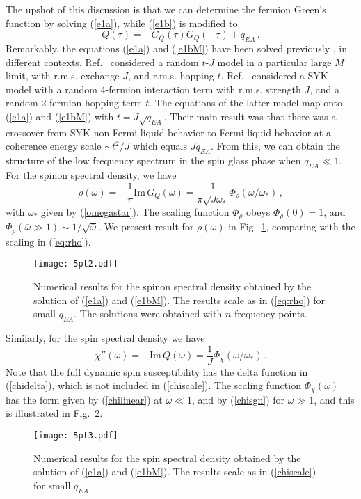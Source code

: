 \documentclass[aps,prx,preprint,onecolumn,citeautoscript,superscriptaddress,nofootinbib,
eqsecnum]{revtex4}
\newcommand{\beq}{\begin{equation}}
\newcommand{\eeq}{\end{equation}}
\begin{document}
{The upshot of this discussion is that we can determine the fermion Green's function by solving (\ref{e1a}), while (\ref{e1b}) is modified to 
\beq
Q(\tau) = - G_Q (\tau) G_Q (-\tau) + q_{EA}\,. \label{e1bM}
\eeq
Remarkably, the equations (\ref{e1a}) and (\ref{e1bM}) have been solved previously \cite{PG98, Balents2017}, in different contexts. Ref.~\cite{PG98} considered a random $t$-$J$ model in a particular large $M$ limit,  with r.m.s. exchange $J$, and r.m.s. hopping $t$. Ref.~\cite{Balents2017} considered a SYK model with a random 4-fermion interaction term with r.m.s. strength $J$, and a random 2-fermion hopping term $t$. The equations of the latter model map onto (\ref{e1a}) and (\ref{e1bM}) with $t = J \sqrt{q_{EA}}$.
Their main result was that there was a crossover from SYK non-Fermi liquid behavior to Fermi liquid behavior at a coherence energy scale $\sim t^2/J$ \cite{PG98, Balents2017} which equals $J q_{EA}$. From this, we can obtain the structure of the low frequency spectrum in the spin glass phase when $q_{EA} \ll 1$. 
For the spinon spectral density, we have
\beq
\rho (\omega)  = - \frac{1}{\pi} \mbox{Im} \, G_Q (\omega) = \frac{1}{\pi \sqrt{J \omega_\ast}} \Phi_\rho (\omega/\omega_\ast)\,, \label{eq:rho}
\eeq
with $\omega_\ast$ given by (\ref{omegastar}). 
The scaling function $\Phi_\rho$ obeys $\Phi_\rho (0) = 1$, and $\Phi_\rho (\overline{\omega} \gg 1) \sim 1/\sqrt{\overline{\omega}}$. We present result for $\rho(\omega)$ in Fig.~\ref{fig:spinon}, comparing with the scaling in (\ref{eq:rho}). 
\begin{figure}
\begin{center}
\texttt{[image: 5pt2.pdf]}
\end{center}
\caption{Numerical results for the spinon spectral density obtained by the solution of (\ref{e1a}) and (\ref{e1bM}). The results scale as in (\ref{eq:rho}) for small $q_{EA}$. The solutions were obtained with $n$ frequency points.}
\label{fig:spinon}
\end{figure}

Similarly, for the spin spectral density we have
\beq
\chi'' (\omega) = - \mbox{Im} \, Q (\omega) = \frac{1}{J} \Phi_\chi (\omega/\omega_\ast)\,. \label{chiscale}
\eeq
Note that the full dynamic spin susceptibility has the delta function in (\ref{chidelta}), which is not included in  (\ref{chiscale}). The scaling function $\Phi_\chi (\overline{\omega})$ has the form given by (\ref{chilinear}) at $\overline{\omega} \ll 1$, and by (\ref{chisgn}) for $\overline{\omega} \gg 1$, and this is illustrated in Fig.~\ref{fig:chi}.
\begin{figure}
\begin{center}
\texttt{[image: 5pt3.pdf]}
\end{center}
\caption{Numerical results for the spin spectral density obtained by the solution of (\ref{e1a}) and (\ref{e1bM}). The results scale as in (\ref{chiscale}) for small $q_{EA}$.}
\label{fig:chi}
\end{figure}


}
\end{document}
